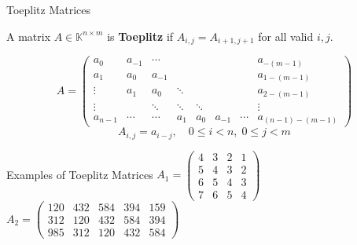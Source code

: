 \begin{frame}{Toeplitz Matrices}
  \begin{definition}
    A matrix $A \in \mathbb{K}^{n \times m}$ is \textbf{Toeplitz} if
    $A_{i,j} = A_{i+1,j+1}$ for all valid $i, j$.
  \end{definition}

  {\footnotesize
    \[
      A =
      \begin{pmatrix}
        a_0     & a_{-1} & \cdots   &        &        &       & & a_{-(m-1)} \\
        a_1     & a_0    & a_{-1}   &        &        &       & & a_{1-(m-1)} \\
        \vdots  & a_1    & a_0      & \ddots &        &       & & a_{2-(m-1)} \\
        \vdots  &        & \ddots   & \ddots & \ddots &       & & \vdots     \\
        a_{n-1} & \cdots & \cdots   & a_1    & a_0    & a_{-1}&\cdots&
        a_{(n-1)-(m-1)}
      \end{pmatrix}
    \]
  }
  \vspace{-0.5em}
  \[ A_{i,j} = a_{i-j}, \quad 0 \le i < n,\; 0 \le j < m \]

  \begin{block}{Examples of Toeplitz Matrices}
    \centering
    $A_{1} =
    \begin{pmatrix}
      4 & 3 & 2 & 1 \\
      5 & 4 & 3 & 2 \\
      6 & 5 & 4 & 3 \\
      7 & 6 & 5 & 4
    \end{pmatrix}$
    \quad
    $A_{2} =
    \begin{pmatrix}
      120 & 432 & 584 & 394 & 159 \\
      312 & 120 & 432 & 584 & 394 \\
      985 & 312 & 120 & 432 & 584
    \end{pmatrix}$
  \end{block}
\end{frame}
